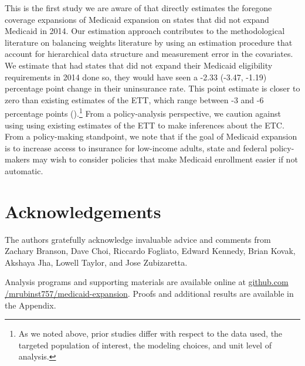 \documentclass[aoas]{imsart}
\theoremstyle{plain}
\theoremstyle{remark}
\begin{document}
This is the first study we are aware of that directly estimates the foregone coverage expansions of Medicaid expansion on states that did not expand Medicaid in 2014. Our estimation approach contributes to the methodological literature on balancing weights literature by using an estimation procedure that account for hierarchical data structure and measurement error in the covariates. We estimate that had states that did not expand their Medicaid eligibility requirements in 2014 done so, they would have seen a -2.33 (-3.47, -1.19) percentage point change in their uninsurance rate. This point estimate is closer to zero than existing estimates of the ETT, which range between -3 and -6 percentage points (\cite{frean2017premium}).\footnote{As we noted above, prior studies differ with respect to the data used, the targeted population of interest, the modeling choices, and unit level of analysis.} From a policy-analysis perspective, we caution against using using existing estimates of the ETT to make inferences about the ETC. From a policy-making standpoint, we note that if the goal of Medicaid expansion is to increase access to insurance for low-income adults, state and federal policy-makers may wish to consider policies that make Medicaid enrollment easier if not automatic.

\section*{Acknowledgements}

The authors gratefully acknowledge invaluable advice and comments from Zachary Branson, Dave Choi, Riccardo Fogliato, Edward Kennedy, Brian Kovak, Akshaya Jha, Lowell Taylor, and Jose Zubizaretta.

\begin{supplement}
Analysis programs and supporting materials are available online at \url{github.com /mrubinst757/medicaid-expansion}. Proofs and additional results are available in the Appendix.
\end{supplement}


\clearpage

\appendix










%


\end{document}
